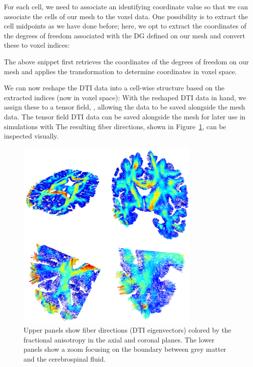 For each cell, we need to associate an identifying coordinate value so
that we can associate the cells of our mesh to the voxel data.  One
possibility is to extract the cell midpoints as we have done before;
here, we opt to extract the coordinates of the degrees of
freedom associated with the DG  defined on our
mesh and convert these to voxel indices:

\noindent The above snippet first retrieves the coordinates of the
 degrees of freedom on our mesh and applies
the  transformation to determine coordinates in voxel
space.

We can now reshape the DTI data into a cell-wise structure based on the 
extracted indices (now in voxel space): 
\noindent With the reshaped DTI data in hand, we assign these to a {\fenics} tensor 
field, , allowing the data to be saved alongside the mesh data.
The {\fenics} tensor field DTI data can be saved alongside the mesh for later use 
in {\fenics} simulations with 
The resulting fiber directions, shown in Figure~\ref{fig:chp5:freesurfer-parc}, 
can be inspected visually.
\begin{figure}	
  \begin{center}
  \includegraphics[width=0.8\textwidth]{./graphics/chp5/fiber-fa-2.png}
  \end{center}
\caption{Upper panels show fiber directions (DTI eigenvectors) colored
  by the fractional anisotropy in the axial and coronal planes. The
  lower panels show a zoom focusing on the boundary between grey
  matter and the cerebrospinal fluid.}
\label{fig:chp5:freesurfer-parc} 
\end{figure}


